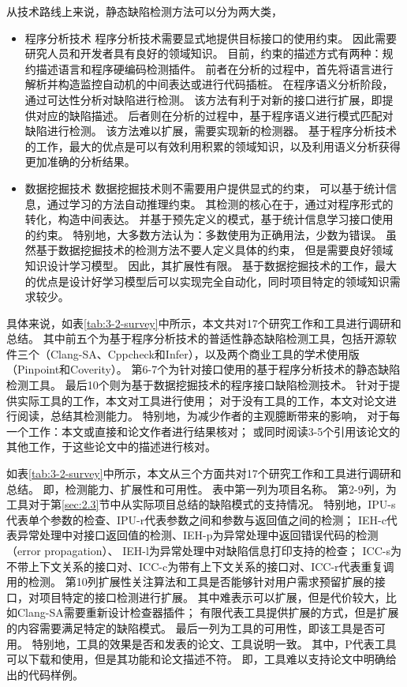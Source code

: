 从技术路线上来说，静态缺陷检测方法可以分为两大类，
\begin{itemize}
	\item {\kaishu 程序分析技术}
	程序分析技术需要显式地提供目标接口的使用约束。
	因此需要研究人员和开发者具有良好的领域知识。
	目前，约束的描述方式有两种：规约描述语言和程序硬编码检测插件。
	前者在分析的过程中，首先将语言进行解析并构造监控自动机的中间表达或进行代码插桩。
	在程序语义分析阶段，通过可达性分析对缺陷进行检测。
	该方法有利于对新的接口进行扩展，即提供对应的缺陷描述。
	后者则在分析的过程中，基于程序语义进行模式匹配对缺陷进行检测。
	该方法难以扩展，需要实现新的检测器。
	基于程序分析技术的工作，最大的优点是可以有效利用积累的领域知识，以及利用语义分析获得更加准确的分析结果。
	\item {\kaishu 数据挖掘技术}
	数据挖掘技术则不需要用户提供显式的约束，
	可以基于统计信息，通过学习的方法自动推理约束。
	其检测的核心在于，通过对程序形式的转化，构造中间表达。
	并基于预先定义的模式，基于统计信息学习接口使用的约束。
	特别地，大多数方法认为：多数使用为正确用法，少数为错误。
	虽然基于数据挖掘技术的检测方法不要人定义具体的约束，
	但是需要良好领域知识设计学习模型。
	因此，其扩展性有限。
	基于数据挖掘技术的工作，最大的优点是设计好学习模型后可以实现完全自动化，同时项目特定的领域知识需求较少。
\end{itemize}

具体来说，如表\ref{tab:3-2-survey}中所示，本文共对17个研究工作和工具进行调研和总结。
其中前五个为基于程序分析技术的普适性静态缺陷检测工具，包括开源软件三个（Clang-SA、Cppcheck和Infer），以及两个商业工具的学术使用版（Pinpoint和Coverity）。
第6-7个为针对接口使用的基于程序分析技术的静态缺陷检测工具。
最后10个则为基于数据挖掘技术的程序接口缺陷检测技术。
针对于提供实际工具的工作，本文对工具进行使用；
对于没有工具的工作，本文对论文进行阅读，总结其检测能力。
特别地，为减少作者的主观臆断带来的影响，
对于每一个工作：本文或直接和论文作者进行结果核对；
或同时阅读3-5个引用该论文的其他工作，于这些论文中的描述进行核对。


如表\ref{tab:3-2-survey}中所示，本文从三个方面共对17个研究工作和工具进行调研和总结。
即，检测能力、扩展性和可用性。
表中第一列为项目名称。
第2-9列，为工具对于第\ref{sec:2.3}节中从实际项目总结的缺陷模式的支持情况。
特别地，IPU-s代表单个参数的检查、IPU-r代表参数之间和参数与返回值之间的检测；
IEH-c代表异常处理中对接口返回值的检测、IEH-p为异常处理中返回错误代码的检测（error propagation）、
IEH-l为异常处理中对缺陷信息打印支持的检查；
ICC-s为不带上下文关系的接口对、ICC-c为带有上下文关系的接口对、ICC-r代表重复调用的检测。
第10列扩展性关注算法和工具是否能够针对用户需求预留扩展的接口，对项目特定的接口检测进行扩展。
其中难表示可以扩展，但是代价较大，比如Clang-SA需要重新设计检查器插件；
有限代表工具提供扩展的方式，但是扩展的内容需要满足特定的缺陷模式。
最后一列为工具的可用性，即该工具是否可用。
特别地，工具的效果是否和发表的论文、工具说明一致。
其中，P代表工具可以下载和使用，但是其功能和论文描述不符。
即，工具难以支持论文中明确给出的代码样例。

